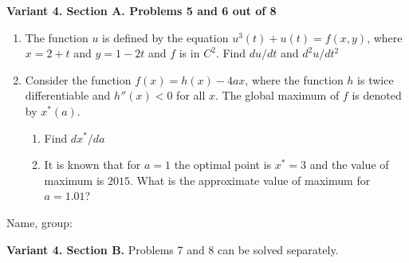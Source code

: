 \documentclass[12pt,a4paper]{article}
\begin{document}
\newpage
\textbf{Variant 4. Section A. Problems 5 and 6 out of 8}


\begin{enumerate}[resume]

\item The function $u$ is defined by the equation $u^3(t) + u(t) = f(x,y)$, where $x=2+t$ and $y=1-2t$ and $f$ is in $C^2$. Find $du/dt$ and $d^2 u/dt^2$



\item Consider the function $f(x)=h(x)-4ax$, where the function $h$ is twice differentiable and $h''(x)<0$ for all $x$. The global maximum of $f$ is denoted by $x^*(a)$.
\begin{enumerate}
\item Find $dx^*/da$
\item It is known that for $a=1$ the optimal point is $x^*=3$ and the value of maximum is $2015$. What is the approximate value of maximum for $a=1.01$?
\end{enumerate}

\end{enumerate}

\begin{framed}
\begin{minipage}{42em}
Name, group:\vspace*{3ex}\par 
\noindent\dotfill
\end{minipage}
\end{framed}



\newpage
\textbf{Variant 4. Section B.} Problems 7 and 8 can be solved separately.
\end{document}
